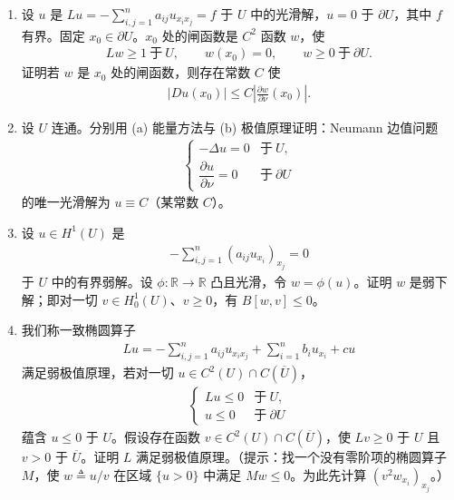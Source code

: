 \documentclass[../../main.tex]{subfiles}
\begin{document}
\begin{enumerate}
\item 设 $u$ 是 $Lu=-\sum_{i,j=1}^{n}a_{ij}u_{x_{i}x_{j}}=f$ 于 $U$ 中的光滑解，$u=0$ 于 $\partial U$，其中 $f$ 有界。固定 $x_{0}\in\partial U$。$x_{0}$ 处的闸函数是 $C^{2}$ 函数 $w$，使
\begin{align*}
Lw\geqslant 1\ \text{于}\ U,\qquad w(x_{0})=0,\qquad w\geqslant 0\ \text{于}\ \partial U.
\end{align*}
证明若 $w$ 是 $x_{0}$ 处的闸函数，则存在常数 $C$ 使
\begin{align*}
|Du(x_{0})|\leqslant C\left|\frac{\partial w}{\partial\nu}(x_{0})\right|.
\end{align*}

\item 设 $U$ 连通。分别用 (a) 能量方法与 (b) 极值原理证明：Neumann 边值问题
\begin{align*}
\begin{cases}
-\Delta u=0 & \text{于}\ U,\\
\dfrac{\partial u}{\partial\nu}=0 & \text{于}\ \partial U
\end{cases}
\end{align*}
的唯一光滑解为 $u\equiv C$（某常数 $C$）。

\item 设 $u\in H^{1}(U)$ 是
\begin{align*}
-\sum_{i,j=1}^{n}(a_{ij}u_{x_{i}})_{x_{j}}=0
\end{align*}
于 $U$ 中的有界弱解。设 $\phi:\mathbb{R}\to\mathbb{R}$ 凸且光滑，令 $w=\phi(u)$。证明 $w$ 是弱下解；即对一切 $v\in H^{1}_{0}(U)$、$v\geqslant 0$，有 $B[w,v]\leqslant 0$。

\item 我们称一致椭圆算子
\begin{align*}
Lu=-\sum_{i,j=1}^{n}a_{ij}u_{x_{i}x_{j}}+\sum_{i=1}^{n}b_{i}u_{x_{i}}+cu
\end{align*}
满足弱极值原理，若对一切 $u\in C^{2}(U)\cap C(\overline{U})$，
\begin{align*}
\begin{cases}
Lu\leqslant 0 & \text{于}\ U,\\
u\leqslant 0 & \text{于}\ \partial U
\end{cases}
\end{align*}
蕴含 $u\leqslant 0$ 于 $U$。假设存在函数 $v\in C^{2}(U)\cap C(\overline{U})$，使 $Lv\geqslant 0$ 于 $U$ 且 $v>0$ 于 $\overline{U}$。证明 $L$ 满足弱极值原理。（提示：找一个没有零阶项的椭圆算子 $M$，使 $w\triangleq u/v$ 在区域 $\{u>0\}$ 中满足 $Mw\leqslant 0$。为此先计算 $(v^{2}w_{x_{i}})_{x_{j}}$。）


\end{enumerate}
\end{document}

